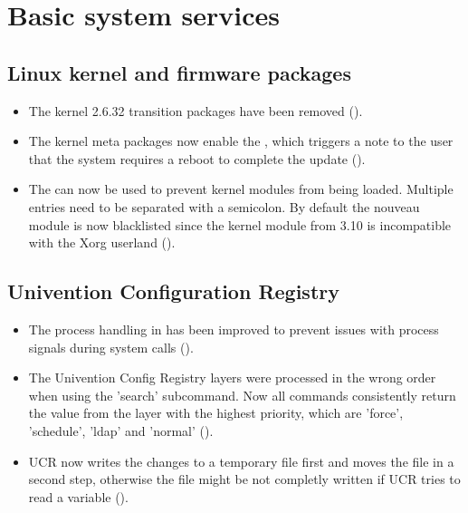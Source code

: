

\section{Basic system services}


\subsection{Linux kernel and firmware packages}
\begin{itemize}
\item The kernel 2.6.32 transition packages have been removed ().

\item The kernel meta packages now enable the
  , which triggers a note to the user
  that the system requires a reboot to complete the update ().

\item The  can now be used to prevent kernel
  modules from being loaded. Multiple entries need to be separated
  with a semicolon. By default the nouveau module is now blacklisted
  since the kernel module from 3.10 is incompatible with the Xorg
  userland ().

\end{itemize}

\subsection{Univention Configuration Registry}
\begin{itemize}
\item The process handling in  has been improved to prevent issues with process
  signals during system calls ().

\item The Univention Config Registry layers were processed in the wrong order when using the 'search' subcommand. Now all commands consistently return the value from the layer with the highest priority, which are 'force', 'schedule', 'ldap' and 'normal' ().

\item UCR now writes the changes to a temporary file first and moves the file
in a second step, otherwise the file might be not completly written if UCR
tries to read a variable ().
\end{itemize}

